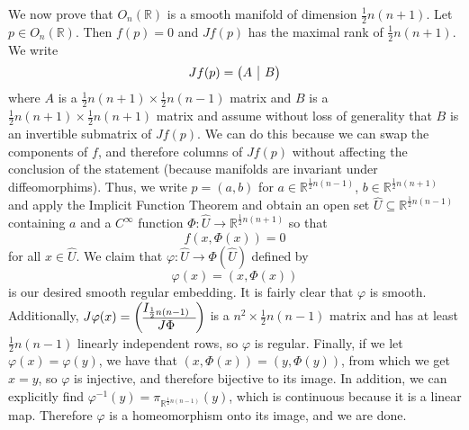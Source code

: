 \documentclass{../../../tex-setup/eh-homework}
\begin{document}
\begin{question}{40}
        We now prove that \(O_n(\mathbb{R})\) is a smooth manifold of dimension \(\frac{1}{2}n(n+1)\). Let \(p \in O_n(\mathbb{R})\). Then \(f(p) = 0\) and \(Jf(p)\) has the maximal rank of \(\frac{1}{2}n(n+1)\). We write
        \[
            Jf(p) = \left( \begin{array}{@{}c|c@{}}
                A & B
            \end{array} \right) 
        \]
        where \(A\) is a \(\frac{1}{2}n(n+1) \times \frac{1}{2}n(n-1)\) matrix and \(B\) is a \(\frac{1}{2}n(n+1) \times \frac{1}{2}n(n+1)\) matrix and assume without loss of generality that \(B\) is an invertible submatrix of \(Jf(p)\). We can do this because we can swap the components of \(f\), and therefore columns of \(Jf(p)\) without affecting the conclusion of the statement (because manifolds are invariant under diffeomorphims). Thus, we write \(p = (a,b)\) for \(a \in \mathbb{R}^{\frac{1}{2}n(n-1)}\), \(b \in \mathbb{R}^{\frac{1}{2}n(n+1)}\) and apply the Implicit Function Theorem and obtain an open set \(\hat{U} \subseteq \mathbb{R}^{\frac{1}{2}n(n-1)}\) containing \(a\) and a \(C^{\infty}\) function \(\Phi : \hat{U} \to \mathbb{R}^{\frac{1}{2}n(n+1)}\) so that
        \[
            f(x, \Phi(x)) = 0
        \]
        for all \(x \in \hat{U}\). We claim that \(\varphi: \hat{U} \to \Phi (\hat{U})\) defined by
        \[
            \varphi (x) = (x, \Phi (x))
        \]
        is our desired smooth regular embedding. It is fairly clear that \(\varphi\) is smooth. Additionally, \(J \varphi (x) = \left( \begin{array}{@{}cc@{}}
            I_{\frac{1}{2}n(n-1)} \\
            \hline
            J\Phi
        \end{array} \right) \) is a \(n^2 \times \frac{1}{2}n(n-1)\) matrix and has at least \(\frac{1}{2}n(n-1)\) linearly independent rows, so \(\varphi\) is regular. Finally, if we let \(\varphi (x) = \varphi (y)\), we have that \((x,\Phi (x)) = (y, \Phi (y))\), from which we get \(x=y\), so \(\varphi\) is injective, and therefore bijective to its image. In addition, we can explicitly find \(\varphi^{-1} (y) = \pi _{\mathbb{R}^{\frac{1}{2}n(n-1)}}(y)\), which is continuous because it is a linear map. Therefore \(\varphi\) is a homeomorphism onto its image, and we are done.
    \end{question}
    \newpage
\end{document}
